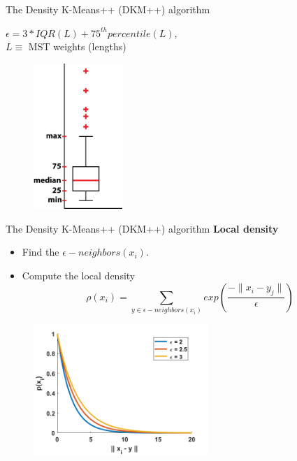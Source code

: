 \documentclass{beamer}
\newlength{\tmpShadow}
\newcommand{\MyShadow}[2]{%
	\settowidth{\tmpShadow}{#1}
	\addtolength{\tmpShadow}{.1em}
	\raisebox{-0.25ex}{\textcolor{gray!70}{#1}}%
	\kern-\tmpShadow%
	\textcolor{#2}{#1}%
}
\begin{document}
{\begin{frame}{The Density K-Means++ (DKM++) algorithm}
	\begin{multicols}{2}
	$\epsilon = 3 * IQR(L) + 75^{th} percentile(L)$,\\
	\vspace{2mm}
	$L \equiv$ MST weights (lengths)
	\vspace{10mm}
	\begin{figure}[H]
		\centering
		\includegraphics[width=0.3\textwidth]{figures/boxplot}
	\end{figure}		
	\end{multicols}
	\vspace{10mm}
\end{frame}

\begin{frame}{The Density K-Means++ (DKM++) algorithm}
	\textbf{Local density}\\
	\begin{itemize}[label={\MyShadow{$\bullet$}{blue!80}}]
		\item Find the $\epsilon-neighbors(x_i)$.
		\item Compute the local density $$\rho(x_i) = \sum_{y \in \epsilon-neighbors(x_i)} exp(\frac{-\lVert x_i - y_j \rVert}{\epsilon})$$
	\end{itemize}
	\begin{figure}[H]
		\centering
		\includegraphics[width=0.59\textwidth]{figures/rho}
	\end{figure}
\end{frame}

}
\end{document}
